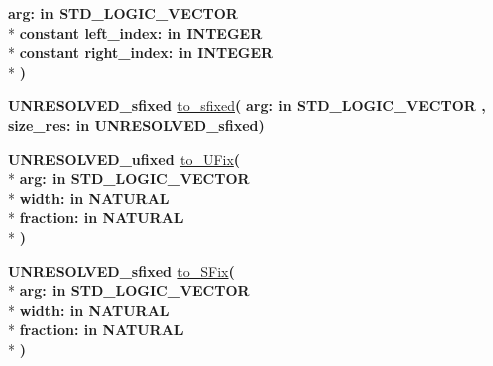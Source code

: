 \begin{DoxyCompactItemize}
{\bfseries \textcolor{vhdlchar}{arg\+: }\textcolor{stringliteral}{in }{\bfseries \textcolor{comment}{S\+T\+D\+\_\+\+L\+O\+G\+I\+C\+\_\+\+V\+E\+C\+T\+O\+R}\textcolor{vhdlchar}{ }}}\\*
{\bfseries {\bfseries \textcolor{keywordflow}{constant}\textcolor{vhdlchar}{ }}\textcolor{vhdlchar}{left\+\_\+index\+: }\textcolor{stringliteral}{in }{\bfseries \textcolor{comment}{I\+N\+T\+E\+G\+E\+R}\textcolor{vhdlchar}{ }}}\\*
{\bfseries {\bfseries \textcolor{keywordflow}{constant}\textcolor{vhdlchar}{ }}\textcolor{vhdlchar}{right\+\_\+index\+: }\textcolor{stringliteral}{in }{\bfseries \textcolor{comment}{I\+N\+T\+E\+G\+E\+R}\textcolor{vhdlchar}{ }}}\\*
{\bfseries  )} 
\item 
{\bfseries {\bfseries \textcolor{vhdlchar}{U\+N\+R\+E\+S\+O\+L\+V\+E\+D\+\_\+sfixed}\textcolor{vhdlchar}{ }}} \hyperlink{class__fixed__pkg_acef6c4472059ccc60871f4189787d202}{to\+\_\+sfixed}{\bfseries  ( }{\bfseries \textcolor{vhdlchar}{arg\+: }\textcolor{stringliteral}{in }{\bfseries \textcolor{comment}{S\+T\+D\+\_\+\+L\+O\+G\+I\+C\+\_\+\+V\+E\+C\+T\+O\+R}\textcolor{vhdlchar}{ }}}{\bfseries  , \textcolor{vhdlchar}{size\+\_\+res\+: }\textcolor{stringliteral}{in }\textcolor{vhdlchar}{U\+N\+R\+E\+S\+O\+L\+V\+E\+D\+\_\+sfixed}}{\bfseries  )} 
\item 
{\bfseries {\bfseries \textcolor{vhdlchar}{U\+N\+R\+E\+S\+O\+L\+V\+E\+D\+\_\+ufixed}\textcolor{vhdlchar}{ }}} \hyperlink{class__fixed__pkg_a8958e5546182abd6114937a60e629a90}{to\+\_\+\+U\+Fix}{\bfseries  ( }\\*
{\bfseries \textcolor{vhdlchar}{arg\+: }\textcolor{stringliteral}{in }{\bfseries \textcolor{comment}{S\+T\+D\+\_\+\+L\+O\+G\+I\+C\+\_\+\+V\+E\+C\+T\+O\+R}\textcolor{vhdlchar}{ }}}\\*
{\bfseries \textcolor{vhdlchar}{width\+: }\textcolor{stringliteral}{in }{\bfseries \textcolor{comment}{N\+A\+T\+U\+R\+A\+L}\textcolor{vhdlchar}{ }}}\\*
{\bfseries \textcolor{vhdlchar}{fraction\+: }\textcolor{stringliteral}{in }{\bfseries \textcolor{comment}{N\+A\+T\+U\+R\+A\+L}\textcolor{vhdlchar}{ }}}\\*
{\bfseries  )} 
\item 
{\bfseries {\bfseries \textcolor{vhdlchar}{U\+N\+R\+E\+S\+O\+L\+V\+E\+D\+\_\+sfixed}\textcolor{vhdlchar}{ }}} \hyperlink{class__fixed__pkg_a5206ba96e8fde8df1ad0cc58d7ea3a8b}{to\+\_\+\+S\+Fix}{\bfseries  ( }\\*
{\bfseries \textcolor{vhdlchar}{arg\+: }\textcolor{stringliteral}{in }{\bfseries \textcolor{comment}{S\+T\+D\+\_\+\+L\+O\+G\+I\+C\+\_\+\+V\+E\+C\+T\+O\+R}\textcolor{vhdlchar}{ }}}\\*
{\bfseries \textcolor{vhdlchar}{width\+: }\textcolor{stringliteral}{in }{\bfseries \textcolor{comment}{N\+A\+T\+U\+R\+A\+L}\textcolor{vhdlchar}{ }}}\\*
{\bfseries \textcolor{vhdlchar}{fraction\+: }\textcolor{stringliteral}{in }{\bfseries \textcolor{comment}{N\+A\+T\+U\+R\+A\+L}\textcolor{vhdlchar}{ }}}\\*
{\bfseries  )} 
\end{DoxyCompactItemize}
